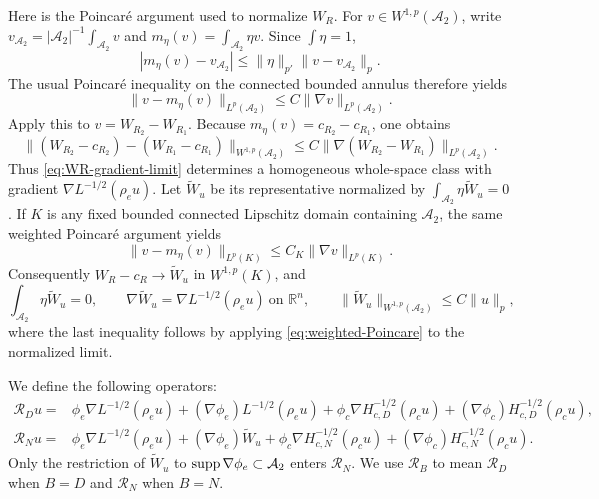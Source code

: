 \documentclass[12pt]{amsart}
\newcommand{\supp}{{\rm supp}{\hspace{.05cm}}}
\theoremstyle{remark}
\begin{document}
Here is the Poincar\'e argument used to normalize \(W_R\).  For
\(v\in W^{1,p}(\mathcal A_2)\), write
\(v_{\mathcal A_2}=|\mathcal A_2|^{-1}\int_{\mathcal A_2}v\) and
\(m_\eta(v)=\int_{\mathcal A_2}\eta v\).  Since \(\int\eta=1\),
\[
 |m_\eta(v)-v_{\mathcal A_2}|
 \le \|\eta\|_{p'}\|v-v_{\mathcal A_2}\|_p .
\]
The usual Poincar\'e inequality on the connected bounded annulus therefore
yields
\begin{equation}\label{eq:weighted-Poincare}
 \|v-m_\eta(v)\|_{L^p(\mathcal A_2)}
 \le C\|\nabla v\|_{L^p(\mathcal A_2)} .
\end{equation}
Apply this to \(v=W_{R_2}-W_{R_1}\).  Because
\(m_\eta(v)=c_{R_2}-c_{R_1}\), one obtains
\begin{equation}\label{eq:WR-Cauchy}
 \|(W_{R_2}-c_{R_2})-(W_{R_1}-c_{R_1})\|_{W^{1,p}(\mathcal A_2)}
 \le C\|\nabla(W_{R_2}-W_{R_1})\|_{L^p(\mathcal A_2)} .
\end{equation}
Thus \eqref{eq:WR-gradient-limit} determines a homogeneous whole-space
class with gradient \(\nabla L^{-1/2}(\rho_eu)\).  Let \(\widetilde W_u\)
be its representative normalized by
\(\int_{\mathcal A_2}\eta\widetilde W_u=0\).  If \(K\) is any fixed
bounded connected Lipschitz domain containing \(\mathcal A_2\), the same
weighted Poincar\'e argument yields
\[
 \|v-m_\eta(v)\|_{L^p(K)}\leq C_K\|\nabla v\|_{L^p(K)}.
\]
Consequently \(W_R-c_R\to\widetilde W_u\) in \(W^{1,p}(K)\), and
\begin{equation}\label{eq:normalized-potential-bound}
 \int_{\mathcal A_2}\eta\widetilde W_u=0,\qquad
 \nabla\widetilde W_u=\nabla L^{-1/2}(\rho_eu)\ \text{on }\mathbb R^n,
 \qquad
 \|\widetilde W_u\|_{W^{1,p}(\mathcal A_2)}
 \le C\|u\|_p,
\end{equation}
where the last inequality follows by applying \eqref{eq:weighted-Poincare} to the normalized limit.

We define the following operators:
\begin{align*}
 \mathcal R_Du={}&
 \phi_e\nabla L^{-1/2}(\rho_eu)
 +(\nabla\phi_e)L^{-1/2}(\rho_eu)+\phi_c\nabla H_{c,D}^{-1/2}(\rho_cu)
 +(\nabla\phi_c)H_{c,D}^{-1/2}(\rho_cu),\\
 \mathcal R_Nu={}&
 \phi_e\nabla L^{-1/2}(\rho_eu)
 +(\nabla\phi_e)\widetilde W_u +\phi_c\nabla H_{c,N}^{-1/2}(\rho_cu)
 +(\nabla\phi_c)H_{c,N}^{-1/2}(\rho_cu).
\end{align*}
Only the restriction of \(\widetilde W_u\) to
\(\supp\nabla\phi_e\subset\mathcal A_2\) enters \(\mathcal R_N\).
We use \(\mathcal R_B\) to mean \(\mathcal R_D\) when \(B=D\) and
\(\mathcal R_N\) when \(B=N\).
\end{document}
